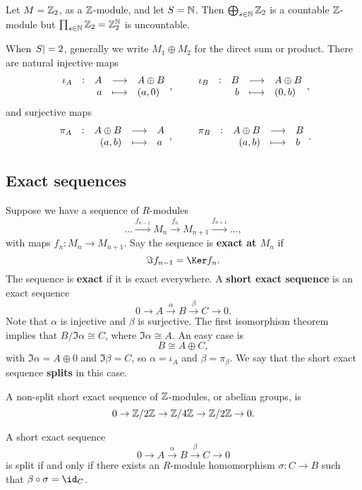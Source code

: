 \begin{example*}
Let $ M = \mathbb{Z}_2 $, as a $ \mathbb{Z} $-module, and let $ S = \mathbb{N} $. Then $ \bigoplus_{s \in \mathbb{N}} \mathbb{Z}_2 $ is a countable $ \mathbb{Z} $-module but $ \prod_{s \in \mathbb{N}} \mathbb{Z}_2 = \mathbb{Z}_2^{\mathbb{N}} $ is uncountable.
\end{example*}

When $ \abs{S} = 2 $, generally we write $ M_1 \oplus M_2 $ for the direct sum or product. There are natural injective maps
$$ \function[\iota_A]{A}{A \oplus B}{a}{\br{a, 0}}, \qquad \function[\iota_B]{B}{A \oplus B}{b}{\br{0, b}}, $$
and surjective maps
$$ \function[\pi_A]{A \oplus B}{A}{\br{a, b}}{a}, \qquad \function[\pi_B]{A \oplus B}{B}{\br{a, b}}{b}. $$

\subsection{Exact sequences}

\begin{definition}
Suppose we have a sequence of $ R $-modules
$$ \dots \xrightarrow{f_{n - 1}} M_n \xrightarrow{f_n} M_{n + 1} \xrightarrow{f_{n + 1}} \dots, $$
with maps $ f_n : M_n \to M_{n + 1} $. Say the sequence is \textbf{exact at $ M_n $} if
$$ \Im f_{n - 1} = \Ker f_n. $$
The sequence is \textbf{exact} if it is exact everywhere. A \textbf{short exact sequence} is an exact sequence
$$ 0 \to A \xrightarrow{\alpha} B \xrightarrow{\beta} C \to 0. $$
Note that $ \alpha $ is injective and $ \beta $ is surjective. The first isomorphism theorem implies that $ B / \Im \alpha \cong C $, where $ \Im \alpha \cong A $. An easy case is
$$ B \cong A \oplus C, $$
with $ \Im \alpha = A \oplus 0 $ and $ \Im \beta = C $, so $ \alpha = \iota_A $ and $ \beta = \pi_\beta $. We say that the short exact sequence \textbf{splits} in this case.
\end{definition}

\pagebreak

\begin{example*}
A non-split short exact sequence of $ \mathbb{Z} $-modules, or abelian groups, is
$$ 0 \to \mathbb{Z} / 2\mathbb{Z} \to \mathbb{Z} / 4\mathbb{Z} \to \mathbb{Z} / 2\mathbb{Z} \to 0. $$
\end{example*}

\begin{proposition}
A short exact sequence
$$ 0 \to A \xrightarrow{\alpha} B \xrightarrow{\beta} C \to 0 $$
is split if and only if there exists an $ R $-module homomorphism $ \sigma : C \to B $ such that $ \beta \circ \sigma = \id_C $.
\end{proposition}

